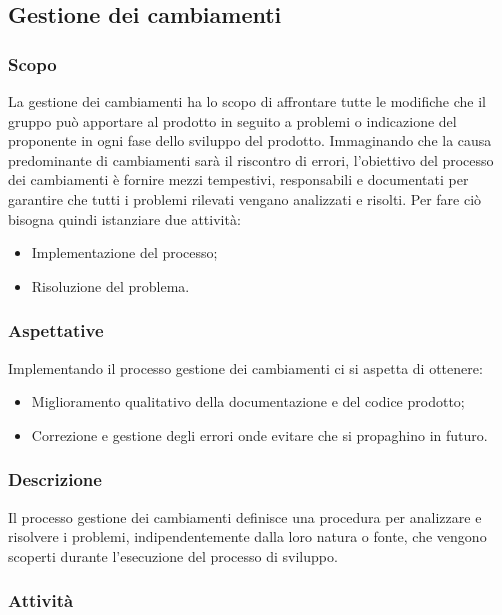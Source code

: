 \subsection{Gestione dei cambiamenti}
\subsubsection{Scopo}
La gestione dei cambiamenti ha lo scopo di affrontare tutte le modifiche che il gruppo può apportare al prodotto in seguito a problemi o indicazione del proponente in ogni fase dello sviluppo del prodotto.
Immaginando che la causa predominante di cambiamenti sarà il riscontro di errori, l'obiettivo del processo dei cambiamenti è fornire mezzi tempestivi, responsabili e documentati per garantire che tutti i problemi rilevati vengano analizzati e risolti. Per fare ciò bisogna quindi istanziare due attività:
\begin{itemize}
    \item Implementazione del processo;
    \item Risoluzione del problema.
\end{itemize}
\subsubsection{Aspettative}
Implementando il processo gestione dei cambiamenti ci si aspetta di ottenere:
\begin{itemize}
    \item Miglioramento qualitativo della documentazione e del codice prodotto;
    \item Correzione e gestione degli errori onde evitare che si propaghino in futuro. 
\end{itemize}
\subsubsection{Descrizione}
Il processo gestione dei cambiamenti definisce una procedura per analizzare e risolvere i problemi, indipendentemente dalla loro natura o fonte, che vengono scoperti durante l'esecuzione del processo di sviluppo.
\subsubsection{Attività}
